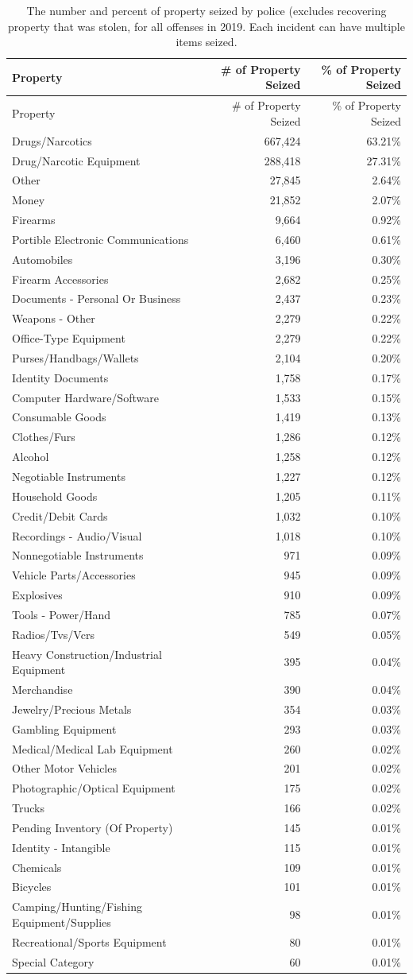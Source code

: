 \documentclass[
  12pt,
  openany]{book}
\begin{document}
\begin{longtable}[]{@{}lrr@{}}
\caption{\label{tab:propertySeizedDescription}The number and percent of property seized by police (excludes recovering property that was stolen, for all offenses in 2019. Each incident can have multiple items seized.}\tabularnewline
\toprule
Property & \# of Property Seized & \% of Property Seized\tabularnewline
\midrule
\endfirsthead
\toprule
Property & \# of Property Seized & \% of Property Seized\tabularnewline
\midrule
\endhead
Drugs/Narcotics & 667,424 & 63.21\%\tabularnewline
Drug/Narcotic Equipment & 288,418 & 27.31\%\tabularnewline
Other & 27,845 & 2.64\%\tabularnewline
Money & 21,852 & 2.07\%\tabularnewline
Firearms & 9,664 & 0.92\%\tabularnewline
Portible Electronic Communications & 6,460 & 0.61\%\tabularnewline
Automobiles & 3,196 & 0.30\%\tabularnewline
Firearm Accessories & 2,682 & 0.25\%\tabularnewline
Documents - Personal Or Business & 2,437 & 0.23\%\tabularnewline
Weapons - Other & 2,279 & 0.22\%\tabularnewline
Office-Type Equipment & 2,279 & 0.22\%\tabularnewline
Purses/Handbags/Wallets & 2,104 & 0.20\%\tabularnewline
Identity Documents & 1,758 & 0.17\%\tabularnewline
Computer Hardware/Software & 1,533 & 0.15\%\tabularnewline
Consumable Goods & 1,419 & 0.13\%\tabularnewline
Clothes/Furs & 1,286 & 0.12\%\tabularnewline
Alcohol & 1,258 & 0.12\%\tabularnewline
Negotiable Instruments & 1,227 & 0.12\%\tabularnewline
Household Goods & 1,205 & 0.11\%\tabularnewline
Credit/Debit Cards & 1,032 & 0.10\%\tabularnewline
Recordings - Audio/Visual & 1,018 & 0.10\%\tabularnewline
Nonnegotiable Instruments & 971 & 0.09\%\tabularnewline
Vehicle Parts/Accessories & 945 & 0.09\%\tabularnewline
Explosives & 910 & 0.09\%\tabularnewline
Tools - Power/Hand & 785 & 0.07\%\tabularnewline
Radios/Tvs/Vcrs & 549 & 0.05\%\tabularnewline
Heavy Construction/Industrial Equipment & 395 & 0.04\%\tabularnewline
Merchandise & 390 & 0.04\%\tabularnewline
Jewelry/Precious Metals & 354 & 0.03\%\tabularnewline
Gambling Equipment & 293 & 0.03\%\tabularnewline
Medical/Medical Lab Equipment & 260 & 0.02\%\tabularnewline
Other Motor Vehicles & 201 & 0.02\%\tabularnewline
Photographic/Optical Equipment & 175 & 0.02\%\tabularnewline
Trucks & 166 & 0.02\%\tabularnewline
Pending Inventory (Of Property) & 145 & 0.01\%\tabularnewline
Identity - Intangible & 115 & 0.01\%\tabularnewline
Chemicals & 109 & 0.01\%\tabularnewline
Bicycles & 101 & 0.01\%\tabularnewline
Camping/Hunting/Fishing Equipment/Supplies & 98 & 0.01\%\tabularnewline
Recreational/Sports Equipment & 80 & 0.01\%\tabularnewline
Special Category & 60 & 0.01\%\tabularnewline

\end{longtable}
\end{document}
